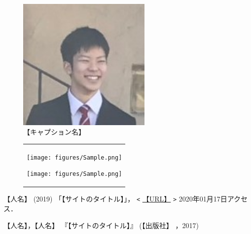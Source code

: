 \documentclass[a4paper, papersize]{jsarticle}
\begin{document}
\begin{multicols}{2}
  \renewcommand{\figurename}{図}
  \setcounter{figure}{2}
  \begin{figure}[H]
    \centering
    \includegraphics[width=65mm]{figures/Sample.jpg}
    \caption{【キャプション名】}
    \label{【ラベル名】}
  \end{figure}
  \noindent

  \begin{figure}[htpb]
    \centering
    \begin{tabular}{c}


      \begin{minipage}{0.47\hsize}
        \centering
        \texttt{[image: figures/Sample.png]}
        \label{foo}
      \end{minipage}


      \begin{minipage}{0.06\hsize}
        \hspace{2mm}
      \end{minipage}


      \begin{minipage}{0.47\hsize}
        \centering
        \texttt{[image: figures/Sample.png]}
        \label{bar}
      \end{minipage} \\
    \end{tabular}
  \end{figure}


  \begin{thebibliography}{99}

    【人名】
    (2019)
    「【サイトのタイトル】」，
    \verb|<| \url{【URL】} \verb|>|
    2020年01月17日アクセス．

    【人名】，【人名】
    『【サイトのタイトル】』
    (【出版社】
    ，2017)

  \end{thebibliography}


\end{multicols}
\end{document}
